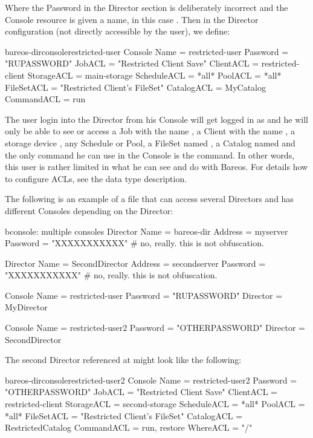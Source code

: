 Where the Password in the Director section is deliberately incorrect and the
Console resource is given a name, in this case . Then
in the Director configuration (not directly accessible by the user), we define:

\begin{bareosConfigResource}{bareos-dir}{console}{restricted-user}
Console {
  Name = restricted-user
  Password = "RUPASSWORD"
  JobACL = "Restricted Client Save"
  ClientACL = restricted-client
  StorageACL = main-storage
  ScheduleACL = *all*
  PoolACL = *all*
  FileSetACL = "Restricted Client's FileSet"
  CatalogACL = MyCatalog
  CommandACL = run
}
\end{bareosConfigResource}

The user login into the Director from his Console will get logged in as 
and he will only be able to see or access a Job with the
name , a Client with the name ,
a storage device , any Schedule or Pool,
a FileSet named , a Catalog named 
and the only command he can use in the Console is the  command.
In other words, this user is rather limited in what he can see
and do with Bareos.
For details how to configure ACLs, see the  data type description.

The following is an example of a   file that can access
several Directors and has different Consoles depending on the Director:

\begin{bconfig}{bconsole: multiple consoles}
Director {
   Name = bareos-dir
   Address = myserver
   Password = "XXXXXXXXXXX"    # no, really.  this is not obfuscation.
}

Director {
   Name = SecondDirector
   Address = secondserver
   Password = "XXXXXXXXXXX"    # no, really.  this is not obfuscation.
}

Console {
   Name = restricted-user
   Password = "RUPASSWORD"
   Director = MyDirector
}

Console {
   Name = restricted-user2
   Password = "OTHERPASSWORD"
   Director = SecondDirector
}
\end{bconfig}

The second Director referenced at  might look
like the following:

\begin{bareosConfigResource}{bareos-dir}{console}{restricted-user2}
Console {
  Name = restricted-user2
  Password = "OTHERPASSWORD"
  JobACL = "Restricted Client Save"
  ClientACL = restricted-client
  StorageACL = second-storage
  ScheduleACL = *all*
  PoolACL = *all*
  FileSetACL = "Restricted Client's FileSet"
  CatalogACL = RestrictedCatalog
  CommandACL = run, restore
  WhereACL = "/"
}
\end{bareosConfigResource}
